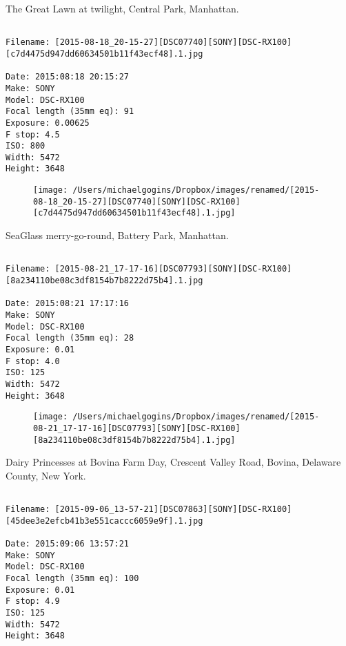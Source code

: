 \clearpage
\onecolumn
\noindent The Great Lawn at twilight, Central Park, Manhattan.
\noindent
\begin{lstlisting}

Filename: [2015-08-18_20-15-27][DSC07740][SONY][DSC-RX100][c7d4475d947dd60634501b11f43ecf48].1.jpg

Date: 2015:08:18 20:15:27
Make: SONY
Model: DSC-RX100
Focal length (35mm eq): 91
Exposure: 0.00625
F stop: 4.5
ISO: 800
Width: 5472
Height: 3648
\end{lstlisting}
\clearpage

\begin{figure}
\texttt{[image: /Users/michaelgogins/Dropbox/images/renamed/[2015-08-18\_20-15-27][DSC07740][SONY][DSC-RX100][c7d4475d947dd60634501b11f43ecf48].1.jpg]}
\end{figure}
    
\clearpage
\onecolumn
\noindent SeaGlass merry-go-round, Battery Park, Manhattan.
\noindent
\begin{lstlisting}

Filename: [2015-08-21_17-17-16][DSC07793][SONY][DSC-RX100][8a234110be08c3df8154b7b8222d75b4].1.jpg

Date: 2015:08:21 17:17:16
Make: SONY
Model: DSC-RX100
Focal length (35mm eq): 28
Exposure: 0.01
F stop: 4.0
ISO: 125
Width: 5472
Height: 3648
\end{lstlisting}
\clearpage

\begin{figure}
\texttt{[image: /Users/michaelgogins/Dropbox/images/renamed/[2015-08-21\_17-17-16][DSC07793][SONY][DSC-RX100][8a234110be08c3df8154b7b8222d75b4].1.jpg]}
\end{figure}
    
\clearpage
\onecolumn
\noindent Dairy Princesses at Bovina Farm Day, Crescent Valley Road, Bovina, Delaware County, New York.
\noindent
\begin{lstlisting}

Filename: [2015-09-06_13-57-21][DSC07863][SONY][DSC-RX100][45dee3e2efcb41b3e551caccc6059e9f].1.jpg

Date: 2015:09:06 13:57:21
Make: SONY
Model: DSC-RX100
Focal length (35mm eq): 100
Exposure: 0.01
F stop: 4.9
ISO: 125
Width: 5472
Height: 3648
\end{lstlisting}
\clearpage

